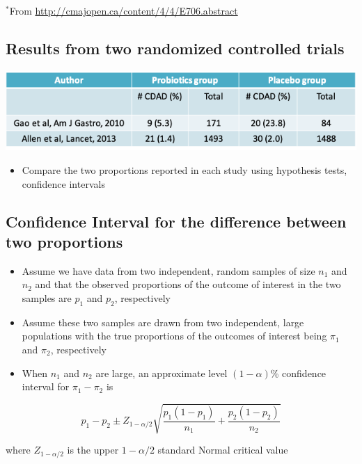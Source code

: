 \documentclass[
]{book}
\providecommand{\tightlist}{%
  \setlength{\itemsep}{0pt}\setlength{\parskip}{0pt}}
\begin{document}
\(^*\)From \url{http://cmajopen.ca/content/4/4/E706.abstract}

\hypertarget{results-from-two-randomized-controlled-trials-1}{%
\subsection{Results from two randomized controlled trials}\label{results-from-two-randomized-controlled-trials-1}}

\includegraphics[width=1\linewidth]{./7_43}

\begin{itemize}
\tightlist
\item
  Compare the two proportions reported in each study using hypothesis tests, confidence intervals
\end{itemize}

\hypertarget{confidence-interval-for-the-difference-between-two-proportions}{%
\subsection{Confidence Interval for the difference between two proportions}\label{confidence-interval-for-the-difference-between-two-proportions}}

\begin{itemize}
\tightlist
\item
  Assume we have data from two independent, random samples of size \(n_1\) and \(n_2\) and that the observed proportions of the outcome of interest in the two samples are \(p_1\) and \(p_2\), respectively
\item
  Assume these two samples are drawn from two independent, large populations with the true proportions of the outcomes of interest being \(\pi_1\) and \(\pi_2\), respectively
\item
  When \(n_1\) and \(n_2\) are large, an approximate level \((1-\alpha)\)\% confidence interval for \(\pi_1-\pi_2\) is
\end{itemize}

\[p_1-p_2\pm Z_{1-\alpha/2}\sqrt{\frac{p_1(1-p_1)}{n_1}+\frac{p_2(1-p_2)}{n_2}}\]

where \(Z_{1-\alpha/2}\) is the upper \(1-\alpha/2\) standard Normal critical value
\end{document}
